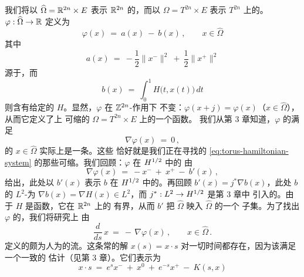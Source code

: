 我们将以 $\widehat{\Omega}=\mathbb{R}^{2n}\times E$ 表示 $\mathbb{R}^{2n}$ 的\trLoopSpace，而以%
$\Omega=T^{2n}\times E$ 表示 $T^{2n}$ 上的\trLoopSpace。\trSmooth\trAction{}%
$\varphi:\widehat{\Omega}\to\mathbb{R}$ 定义为
\begin{equation}\label{eq:torus-action}
\varphi(x)\ =\ a(x)\ -\ b(x)\,,\qquad x\in\widehat{\Omega}
\end{equation}
其中
\begin{equation}\label{eq:torus-a-quadratic}
a(x)\ =\ -\frac{1}{2}\bigl\|x^{-}\bigr\|^{2}\ +\ \frac{1}{2}\bigl\|x^{+}\bigr\|^{2}
\end{equation}
源于\trSymplecticStructure，而
\begin{equation}\label{eq:torus-b-potential}
b(x)\ =\ \int_{0}^{1}H\bigl(t,x(t)\bigr)\,dt
\end{equation}
则含有给定的\trHamiltonianFunction{} $H$。显然，$\varphi$ 在 $\mathbb{Z}^{2n}$-作用下%
不变：$\varphi(x+j)=\varphi(x)$（$x\in\widehat{\Omega}$），从而它定义了\trTorus{}上%
可缩\trLoop{}的\trLoopSpace{} $\Omega=T^{2n}\times E$ 上的一个\trSmooth{}函数。%
我们从第 3 章知道，$\varphi$ 的满足
\begin{equation}\label{eq:torus-critical-eq}
\nabla\varphi(x)\ =\ 0\,,
\end{equation}
的\trCriticalPoint{} $x\in\widehat{\Omega}$ 实际上是一条\trSmooth\trLoop。这些%
\trCriticalPoint{}恰好就是我们正在寻找的 \eqref{eq:torus-hamiltonian-system}%
的那些可缩\trPeriodicSolution。我们回顾：$\varphi$ 在 $H^{1/2}$ 中的%
\trGradient{}由
\begin{equation}\label{eq:torus-gradient}
\nabla\varphi(x)\ =\ -x^{-}\ +\ x^{+}\ -\ b'(x)\,,
\end{equation}
给出，此处以 $b'(x)$ 表示 $b$ 在 $H^{1/2}$ 中的\trGradient。再回顾%
$b'(x)=j^{*}\nabla b(x)$，此处 $b$ 的 $L^{2}$-\trGradient{}为%
$\nabla b(x)=\nabla H(x)\in L^{2}$，而 $j^{*}:L^{2}\to H^{1/2}$ 是第 3 章中%
引入的\trCompactOperator。由于 $H$ 是\trPeriodic{}函数，它在 $\mathbb{R}^{2n}$ 上的%
\trGradient{}有界，从而 $b'$ 把 $\widehat{\Omega}$ 映入 $\widehat{\Omega}$ 的一个%
\trCompact{}子集。为了找出 $\varphi$ 的\trCriticalPoint，我们将研究\trLoopSpace{}上%
由
\begin{equation}\label{eq:torus-gradient-flow}
\frac{d}{ds}\,x\ =\ -\,\nabla\varphi(x)\,,\qquad x\in\widehat{\Omega}\,.
\end{equation}
定义的颇为人为的\trGradient{}流。这条\trSmooth{}常\trDifferentialEquation{}的解%
$x(s)=x\cdot s$ 对一切时间都存在，因为该\trGradient{}满足一个一致的%
\trLipschitz{}估计（见第 3 章）。它们表示为
\[
x\cdot s\ =\ e^{s}x^{-}\ +\ x^{0}\ +\ e^{-s}x^{+}\ -\ K(s,x)
\]
